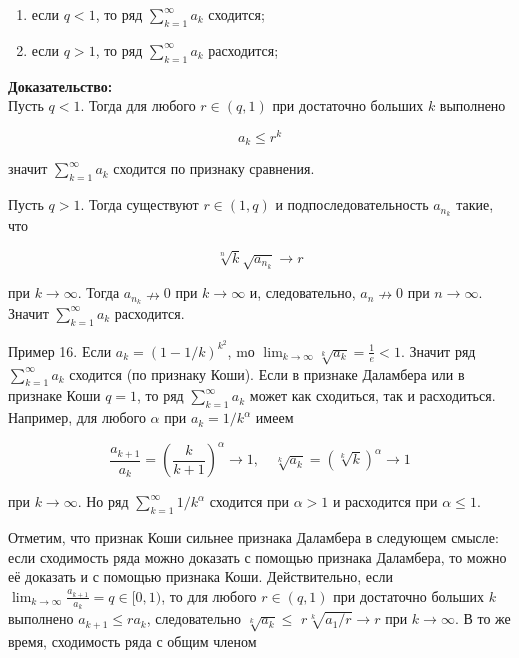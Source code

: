 \documentclass[a4paper,12pt]{article} %
\begin{document}
	\begin{enumerate}
		\item если $q<1$, то ряд $\sum_{k=1}^{\infty} a_{k}$ сходится;
	
		\item если $q>1$, то ряд $\sum_{k=1}^{\infty} a_{k}$ расходится;
	
	\end{enumerate}
	
	\textbf{Доказательство:\\}
	Пусть $q<1$. Тогда для любого $r \in(q, 1)$ при достаточно больших $k$ выполнено
	
	$$
	a_{k} \leq r^{k}
	$$
	
	значит $\sum_{k=1}^{\infty} a_{k}$ сходится по признаку сравнения.
	
	Пусть $q>1$. Тогда существуют $r \in(1, q)$ и подпоследовательность $a_{n_{k}}$ такие, что
	
	$$
	\sqrt[n]{k} \sqrt{a_{n_{k}}} \rightarrow r
	$$
	
	при $k \rightarrow \infty$. Тогда $a_{n_{k}} \nrightarrow 0$ при $k \rightarrow \infty$ и, следовательно, $a_{n} \nrightarrow 0$ при $n \rightarrow \infty$. Значит $\sum_{k=1}^{\infty} a_{k}$ расходится.
	
	Пример 16. Если $a_{k}=(1-1 / k)^{k^{2}}$, mо $\lim _{k \rightarrow \infty} \sqrt[k]{a_{k}}=\frac{1}{e}<1$. Значит ряд $\sum_{k=1}^{\infty} a_{k}$ сходится (по признаку Коши). Если в признаке Даламбера или в признаке Коши $q=1$, то ряд $\sum_{k=1}^{\infty} a_{k}$ может как сходиться, так и расходиться. Например, для любого $\alpha$ при $a_{k}=1 / k^{\alpha}$ имеем
	
	$$
	\frac{a_{k+1}}{a_{k}}=\left(\frac{k}{k+1}\right)^{\alpha} \rightarrow 1, \quad \sqrt[k]{a_{k}}=(\sqrt[k]{k})^{\alpha} \rightarrow 1
	$$
	
	при $k \rightarrow \infty$. Но ряд $\sum_{k=1}^{\infty} 1 / k^{\alpha}$ сходится при $\alpha>1$ и расходится при $\alpha \leq 1$.
	
	Отметим, что признак Коши сильнее признака Даламбера в следующем смысле: если сходимость ряда можно доказать с помощью признака Даламбера, то можно её доказать и с помощью признака Коши. Действительно, если $\lim _{k \rightarrow \infty} \frac{a_{k+1}}{a_{k}}=q \in[0,1)$, то для любого $r \in(q, 1)$ при достаточно больших $k$ выполнено $a_{k+1} \leq r a_{k}$, следовательно $\sqrt[k]{a_{k}} \leq$ $r \sqrt[k]{a_{1} / r} \rightarrow r$ при $k \rightarrow \infty$. В то же время, сходимость ряда с общим членом
	
\end{document}
